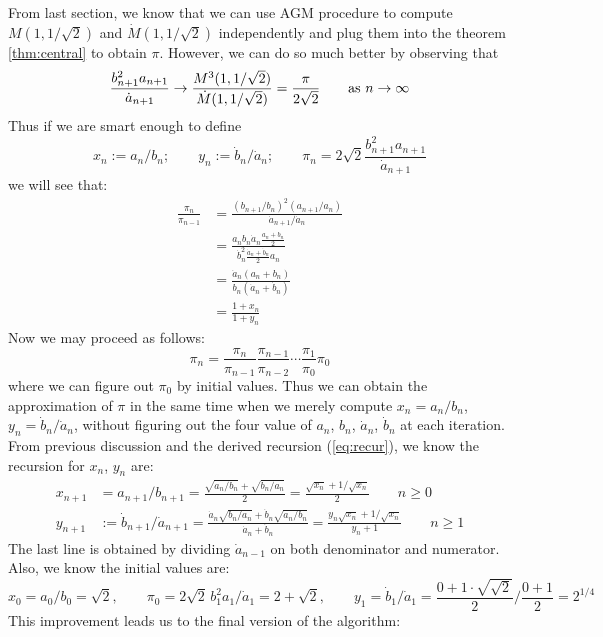 \documentclass{report}
\def\ff#1#2{\frac{#1}{#2}}
\def\sq#1{\sqrt{#1}}
\begin{document}
\begin{titlepage}
From last section, we know that we can use AGM procedure to compute $M(1,1/\sqrt2)$ and $\dot M(1,1/\sqrt2)$ independently and plug them into the theorem \ref{thm:central} to obtain $\pi$. However, we can do so much better by observing that{\rm\cite{Borwein:1987aa}}
\begin{align}
\frac{b^2_{n+1}a_{n+1}}{\dot a_{n+1}}\to\frac{M^3(1,1/\sqrt2)}{\dot M(1,1/\sqrt2)}=\ff{\pi}{2\sq2}\qquad{\rm as }\,\, n\to\infty\label{eq:central}
\end{align}
Thus if we are smart enough to define{\rm\cite{Borwein:1987aa}}
\[
x_n:=a_n/b_n;\qquad y_n:=\dot b_n/\dot a_n;\qquad \pi_n=2\sqrt2\frac{b^2_{n+1}a_{n+1}}{\dot a_{n+1}}
\]
we will see that:
\begin{align*}
\frac{\pi_n}{\pi_{n-1}}&=\frac{(b_{n+1}/b_n)^2(a_{n+1}/a_n)}{\dot a_{n+1}/\dot a_n}\\
&=\frac{a_nb_n\dot a_n \frac{a_n+b_n}{2}}{\dot b_n^2\frac{\dot a_n+\dot b_n}{2}a_n}\\
&=\frac{\dot a_n(a_n+b_n)}{b_n(\dot a_n+\dot b_n)}\\
&=\frac{1+x_n}{1+y_n}
\end{align*}
Now we may proceed as follows:
\[
\pi_n=\frac{\pi_{n}}{\pi_{n-1}}\frac{\pi_{n-1}}{\pi_{n-2}}\cdots\frac{\pi_{1}}{\pi_{0}}\pi_0
\]
where we can figure out $\pi_0$ by initial values. Thus we can obtain the approximation of $\pi$ in the same time when we merely compute $x_n=a_n/b_n$, $y_n=\dot b_n/\dot a_n$, without figuring out the four value of $a_n$, $b_n$, $\dot a_n$, $\dot b_n$ at each iteration\cite{Borwein:1987aa}. From previous discussion and the derived recursion (\ref{eq:recur}), we know the recursion for $x_n$, $y_n$ are\cite{Borwein:1987aa}:
\begin{align*}
x_{n+1}&=a_{n+1}/b_{n+1}=\frac{\sqrt {a_n/b_n}+\sqrt {b_n/a_n} }{2}=\frac{\sqrt{x_n}+1/{\sqrt{x_n}}}{2}\qquad n\ge 0\\
y_{n+1}&:=\dot b_{n+1}/\dot a_{n+1}=\frac{\dot a_{n}\sqrt{b_{n}/a_{n}}
+\dot b_{n}\sqrt{a_{n}/b_{n}}}{\dot a_{n}+\dot b_{n}}=\frac{y_n\sqrt{x_n}+1/\sqrt{x_{n}}}{y_n+1}\qquad n\ge 1
\end{align*}
The last line is obtained by dividing $\dot a_{n-1}$ on both denominator and numerator.\\
Also, we know the initial values are:
\[
x_0=a_0/b_0=\sqrt2,\qquad \pi_0=2\sqrt2\,b_1^2a_1/\dot a_1=2+\sqrt2,\qquad
y_1=\dot b_1/\dot a_1=\frac{0+1\cdot\sqrt{\sqrt2}}{2}\Big/\frac{0+1}{2}=2^{1/4}
\]
This improvement leads us to the final version of the algorithm:
\begin{algorithm}\label{al}\cite{Borwein:1987aa}

\end{algorithm}
\end{titlepage}
\end{document}
